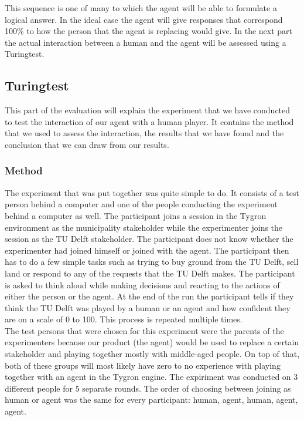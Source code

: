 This sequence is one of many to which the agent will be able to formulate a logical answer. In the ideal case the agent will give responses that correspond 100\% to how the person that the agent is replacing would give. In the next part the actual interaction between a human and the agent will be assessed using a Turingtest.

\subsection{Turingtest}
This part of the evaluation will explain the experiment that we have conducted to test the interaction of our agent with a human player. It contains the method that we used to assess the interaction, the results that we have found and the conclusion that we can draw from our results. 

\subsubsection{Method}
The experiment that was put together was quite simple to do. It consists of a test person behind a computer and one of the people conducting the experiment behind a computer as well. The participant joins a session in the Tygron environment as the municipality stakeholder while the experimenter joins the session as the TU Delft stakeholder. The participant does not know whether the experimenter had joined himself or joined with the agent. The participant then has to do a few simple tasks such as trying to buy ground from the TU Delft, sell land or respond to any of the requests that the TU Delft makes. The participant is asked to think aloud while making decisions and reacting to the actions of either the person or the agent. At the end of the run the participant tells if they think the TU Delft was played by a human or an agent and how confident they are on a scale of 0 to 100. This process is repeated multiple times. \\

The test persons that were chosen for this experiment were the parents of the experimenters because our product (the agent) would be used to replace a certain stakeholder and playing together mostly with middle-aged people. On top of that, both of these groups will most likely have zero to no experience with playing together with an agent in the Tygron engine. The expiriment was conducted on 3 different people for 5 separate rounds. The order of choosing between joining as human or agent was the same for every participant: human, agent, human, agent, agent.

